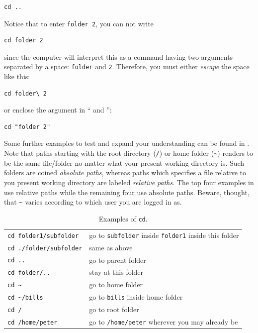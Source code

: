 \begin{verbatim}
cd ..
\end{verbatim}

Notice that to enter \verb|folder 2|, you can not write

\begin{verbatim}
cd folder 2
\end{verbatim}
since the computer will interpret this as a command having two arguments separated by a space: \verb|folder| and \verb|2|. Therefore, you must either \emph{escape} the space like this:

\begin{verbatim}
cd folder\ 2
\end{verbatim}
or enclose the argument in `` and '':

\begin{verbatim}
cd "folder 2"
\end{verbatim}

Some further examples to test and expand your understanding can be found in . Note that paths starting with the root directory (\verb|/|) or home folder (\verb|~|) renders to be the same file/folder no matter what your present working directory is. Such folders are coined \emph{absolute paths}, whereas paths which specifies a file relative to you present working directory are labeled \emph{relative paths}. The top four examples in  use relative paths while the remaining four use absolute paths. Beware, thought, that \verb|~| varies according to which user you are logged in as.

\begin{table}
	\centering
	\caption{Examples of \texttt{cd}.}
	\begin{tabular}{ll}
	\hline
	\verb|cd folder1/subfolder|	&	go to \verb|subfolder| inside \verb|folder1| inside this folder	\\
	\verb|cd ./folder/subfolder|	&	same as above		\\
	\verb|cd ..|					&	go to parent folder	\\
	\verb|cd folder/..|			&	stay at this folder	\\
	\verb|cd ~|					&	go to home folder 	\\
	\verb|cd ~/bills|			&	go to \verb|bills| inside home folder \\
	\verb|cd /|					&	go to root folder	\\
	\verb|cd /home/peter|		&	go to \verb|/home/peter| wherever you may already be
	\end{tabular}
	\label{tab:bash:cd}
\end{table}


